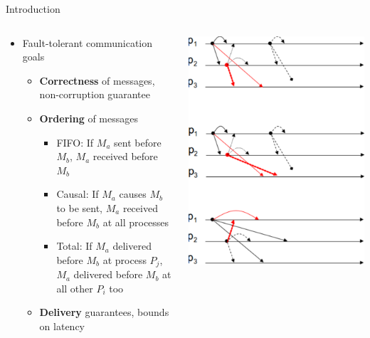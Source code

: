 \documentclass[pdftex]{beamer}
\begin{document}
\begin{frame}{Introduction}
\begin{columns}
\begin{column}{.5\textwidth}

\begin{itemize}
	\item Fault-tolerant communication goals
	\begin{itemize}
		\item \textbf{Correctness} of messages, non-corruption guarantee
		\item \textbf{Ordering} of messages
		\begin{itemize}
			\item FIFO: If $M_a$ sent before $M_b$, $M_a$ received before $M_b$
			\item Causal: If $M_a$ causes $M_b$ to be sent, $M_a$ received before $M_b$ at all processes
			\item Total: If $M_a$ delivered before $M_b$ at process $P_j$, $M_a$ delivered before $M_b$ at all other $P_i$ too
		\end{itemize}
		\item \textbf{Delivery} guarantees, bounds on latency
	\end{itemize}
\end{itemize}
\end{column}
	
\begin{column}{.5\textwidth}
\includegraphics[width=\textwidth]{message_ordering}
\end{column}

\end{columns}
\end{frame}
\end{document}
